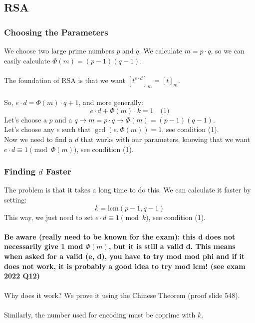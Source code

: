 \documentclass{article}
\begin{document}
\newpage

\subsection{RSA}

\subsubsection{Choosing the Parameters}

We choose two large prime numbers \( p \) and \( q \).
We calculate \( m = p \cdot q \), so we can easily calculate \(\Phi(m) = (p-1)(q-1)\).\\\\
The foundation of RSA is that we want \([t^{e \cdot d}]_m = [t]_m\).\\\\
So, \( e \cdot d = \Phi(m) \cdot q + 1 \), and more generally:
\[
e \cdot d + \Phi(m) \cdot k = 1 \quad \text{(1)}
\]
Let's choose a \( p \) and a \( q \rightarrow m = p \cdot q \rightarrow \Phi(m) = (p-1)(q-1)\).\\
Let's choose any \( e \) such that \( \gcd(e, \Phi(m)) = 1 \), see condition (1).\\
Now we need to find a \( d \) that works with our parameters, knowing that we want \( e \cdot d \equiv 1 \pmod{\Phi(m)} \), see condition (1).

\subsubsection{Finding \( d \) Faster}

The problem is that it takes a long time to do this. We can calculate it faster by setting:
\[
k = \mathrm{lcm}(p - 1, q - 1)
\]
This way, we just need to set \( e \cdot d \equiv 1 \pmod{k} \), see condition (1).\\\\
\textbf{Be aware (really need to be known for the exam): this d does not necessarily give 1 mod \(\Phi(m)\), but it is still a valid d. This means when asked for a valid (e, d), you have to try mod mod phi and if it does not work, it is probably a good idea to try mod lcm! (see exam 2022 Q12)}\\\\
Why does it work? We prove it using the Chinese Theorem (proof slide 548).\\\\
Similarly, the number used for encoding must be coprime with \( k \).\\\\
\end{document}
